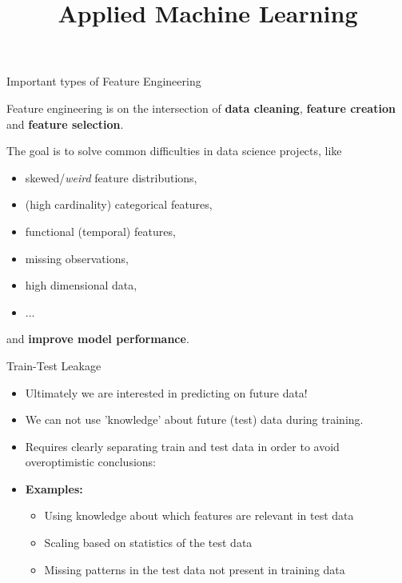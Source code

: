 \documentclass[11pt,compress,t,notes=noshow, xcolor=table]{beamer}
\title{Applied Machine Learning}
\date{}
\begin{document}



\begin{vbframe}{Important types of Feature Engineering}

Feature engineering is on the intersection of \textbf{data cleaning}, \textbf{feature creation} and \textbf{feature selection}.

\lz

The goal is to solve common difficulties in data science projects, like

\begin{itemize}
\item skewed/\textit{weird} feature distributions,
\item (high cardinality) categorical features,
\item functional (temporal) features,
\item missing observations,
\item high dimensional data,
\item ...
\end{itemize}

and \textbf{improve model performance}.

\end{vbframe}


\begin{vbframe}{Train-Test Leakage}

\begin{itemize}
\item Ultimately we are interested in predicting on future data!

\item We can not use 'knowledge' about future (test) data during training.

\item Requires clearly separating train and test data in order to avoid overoptimistic conclusions:

\item \textbf{Examples:}

  \begin{itemize}
  \item Using knowledge about which features are relevant in test data
  
  \item Scaling based on statistics of the test data 
  
  \item Missing patterns in the test data not present in training data
  \end{itemize}
\end{itemize}

\end{vbframe}
\end{document}
